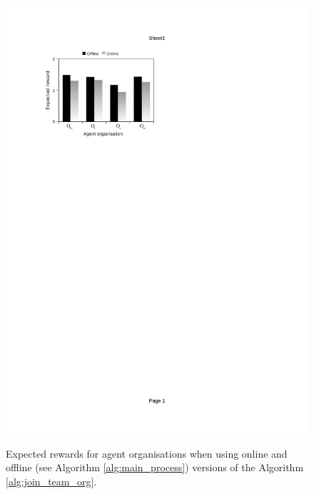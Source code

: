 \documentclass{llncs}
\begin{document}
\begin{figure}[H]
{  \includegraphics[clip=true, trim=70 579 300 90, scale=0.77]{images/w2_dtmc}
}
\caption{Expected rewards for agent organisations when using online and offline (see Algorithm \ref{alg:main_process}) versions of the Algorithm \ref{alg:join_team_org}.}
\label{fig:bar_chart_dtmc}
\end{figure}
\end{document}

